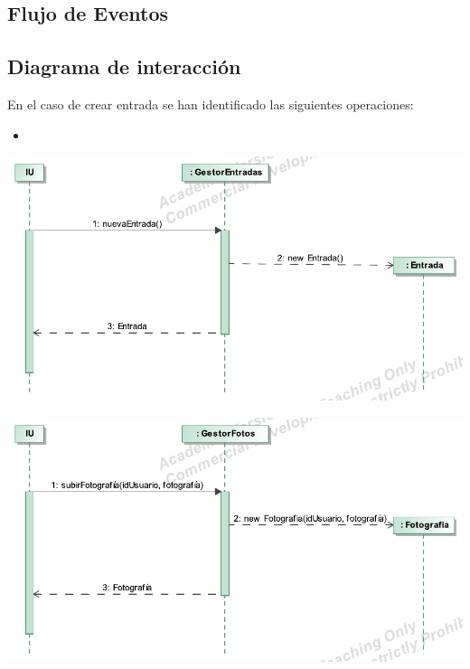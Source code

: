 \documentclass[12pt, a4paper, titlepage]{article}
\begin{document}
\subsection{Flujo de Eventos}


\subsection{Diagrama de interacción}

En el caso de {\sc crear entrada} se han identificado las siguientes operaciones:

\begin{itemize}
	\item 
\end{itemize}
\begin{center}
	\includegraphics{Imagenes/OperacionNuevaEntrada.pdf}
\end{center}

\begin{center}
	\includegraphics{Imagenes/OperacionSubirFotografia}
\end{center}
\end{document}
